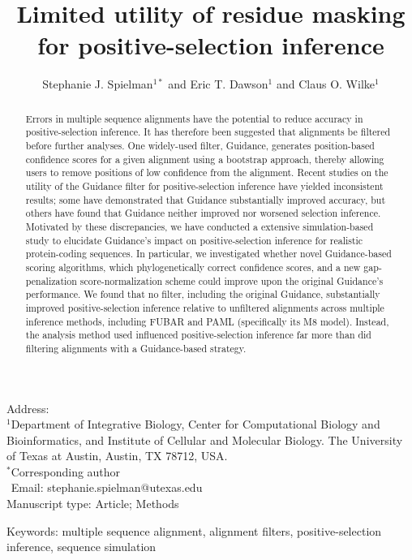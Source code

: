 \documentclass[11pt]{article}
\begin{document}
\title{\textbf{Limited utility of residue masking for positive-selection inference}}
\author{Stephanie J. Spielman$^{1*}$ and Eric T. Dawson$^{1}$ and Claus O. Wilke$^{1}$}
\date{}

\maketitle
\noindent
Address:\\
$^1$Department of Integrative Biology, Center for Computational Biology and Bioinformatics, and Institute of Cellular and Molecular Biology.
The University of Texas at Austin, Austin, TX 78712, USA.\\

\bigskip
\noindent
$^*$Corresponding author\\
$\phantom{^*}$Email: stephanie.spielman@utexas.edu\\

\bigskip
\noindent
Manuscript type: Article; Methods

\bigskip
\noindent Keywords: multiple sequence alignment, alignment filters, positive-selection inference, sequence simulation

\newpage
\begin{abstract}
Errors in multiple sequence alignments have the potential to reduce accuracy in positive-selection inference. It has therefore been suggested that alignments be filtered before further analyses. One widely-used filter, Guidance, generates position-based confidence scores for a given alignment using a bootstrap approach, thereby allowing users to remove positions of low confidence from the alignment. Recent studies on the utility of the Guidance filter for positive-selection inference have yielded inconsistent results; some have demonstrated that Guidance substantially improved accuracy, but others have found that Guidance neither improved nor worsened selection inference. Motivated by these discrepancies, we have conducted a extensive simulation-based study to elucidate Guidance's impact on positive-selection inference for realistic protein-coding sequences. In particular, we investigated whether novel Guidance-based scoring algorithms, which phylogenetically correct confidence scores, and a new gap-penalization score-normalization scheme could improve upon the original Guidance's performance. We found that no filter, including the original Guidance, substantially improved positive-selection inference relative to unfiltered alignments across multiple inference methods, including FUBAR and PAML (specifically its M8 model). Instead, the analysis method used influenced positive-selection inference far more than did filtering alignments with a Guidance-based strategy.
\end{abstract}
\end{document}
